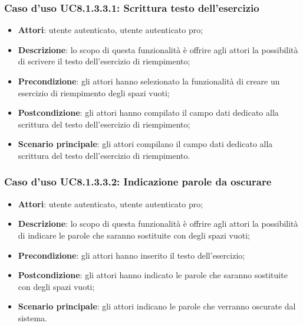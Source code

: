 \subsubsection{Caso d'uso UC8.1.3.3.1: Scrittura testo dell'esercizio}
	\begin{itemize}
		\item
			\textbf{Attori}: utente autenticato, utente autenticato pro;
		\item		
			\textbf{Descrizione}: lo scopo di questa funzionalità è offrire agli attori la possibilità di scrivere il testo dell'esercizio di riempimento;
		\item
			\textbf{Precondizione}: gli attori hanno selezionato la funzionalità di creare un esercizio di riempimento degli spazi vuoti; 
		\item
			\textbf{Postcondizione}: gli attori hanno compilato il campo dati dedicato alla scrittura del testo dell'esercizio di riempimento;
		\item
			\textbf{Scenario principale}: gli attori compilano il campo dati dedicato alla scrittura del testo dell'esercizio di riempimento.
	\end{itemize}


\subsubsection{Caso d'uso UC8.1.3.3.2: Indicazione parole da oscurare}
	\begin{itemize}
		\item
			\textbf{Attori}: utente autenticato, utente autenticato pro;
		\item		
			\textbf{Descrizione}: lo scopo di questa funzionalità è offrire agli attori la possibilità di indicare le parole che saranno sostituite con degli spazi vuoti;
		\item
			\textbf{Precondizione}: gli attori hanno inserito il testo dell'esercizio; 
		\item
			\textbf{Postcondizione}: gli attori hanno indicato le parole che saranno sostituite con degli spazi vuoti;
		\item
			\textbf{Scenario principale}: gli attori indicano le parole che verranno oscurate dal sistema.
	\end{itemize}